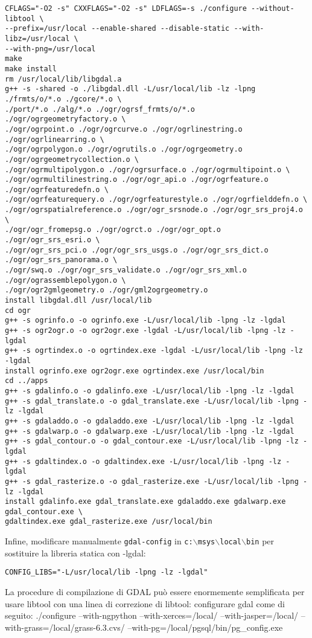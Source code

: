 \begin{verbatim}
CFLAGS="-O2 -s" CXXFLAGS="-O2 -s" LDFLAGS=-s ./configure --without-libtool \
--prefix=/usr/local --enable-shared --disable-static --with-libz=/usr/local \
--with-png=/usr/local
make
make install
rm /usr/local/lib/libgdal.a
g++ -s -shared -o ./libgdal.dll -L/usr/local/lib -lz -lpng ./frmts/o/*.o ./gcore/*.o \
./port/*.o ./alg/*.o ./ogr/ogrsf_frmts/o/*.o ./ogr/ogrgeometryfactory.o \
./ogr/ogrpoint.o ./ogr/ogrcurve.o ./ogr/ogrlinestring.o ./ogr/ogrlinearring.o \
./ogr/ogrpolygon.o ./ogr/ogrutils.o ./ogr/ogrgeometry.o ./ogr/ogrgeometrycollection.o \
./ogr/ogrmultipolygon.o ./ogr/ogrsurface.o ./ogr/ogrmultipoint.o \
./ogr/ogrmultilinestring.o ./ogr/ogr_api.o ./ogr/ogrfeature.o ./ogr/ogrfeaturedefn.o \ 
./ogr/ogrfeaturequery.o ./ogr/ogrfeaturestyle.o ./ogr/ogrfielddefn.o \
./ogr/ogrspatialreference.o ./ogr/ogr_srsnode.o ./ogr/ogr_srs_proj4.o \
./ogr/ogr_fromepsg.o ./ogr/ogrct.o ./ogr/ogr_opt.o ./ogr/ogr_srs_esri.o \
./ogr/ogr_srs_pci.o ./ogr/ogr_srs_usgs.o ./ogr/ogr_srs_dict.o ./ogr/ogr_srs_panorama.o \
./ogr/swq.o ./ogr/ogr_srs_validate.o ./ogr/ogr_srs_xml.o ./ogr/ograssemblepolygon.o \
./ogr/ogr2gmlgeometry.o ./ogr/gml2ogrgeometry.o
install libgdal.dll /usr/local/lib
cd ogr
g++ -s ogrinfo.o -o ogrinfo.exe -L/usr/local/lib -lpng -lz -lgdal
g++ -s ogr2ogr.o -o ogr2ogr.exe -lgdal -L/usr/local/lib -lpng -lz -lgdal
g++ -s ogrtindex.o -o ogrtindex.exe -lgdal -L/usr/local/lib -lpng -lz -lgdal
install ogrinfo.exe ogr2ogr.exe ogrtindex.exe /usr/local/bin
cd ../apps
g++ -s gdalinfo.o -o gdalinfo.exe -L/usr/local/lib -lpng -lz -lgdal
g++ -s gdal_translate.o -o gdal_translate.exe -L/usr/local/lib -lpng -lz -lgdal
g++ -s gdaladdo.o -o gdaladdo.exe -L/usr/local/lib -lpng -lz -lgdal
g++ -s gdalwarp.o -o gdalwarp.exe -L/usr/local/lib -lpng -lz -lgdal
g++ -s gdal_contour.o -o gdal_contour.exe -L/usr/local/lib -lpng -lz -lgdal
g++ -s gdaltindex.o -o gdaltindex.exe -L/usr/local/lib -lpng -lz -lgdal
g++ -s gdal_rasterize.o -o gdal_rasterize.exe -L/usr/local/lib -lpng -lz -lgdal
install gdalinfo.exe gdal_translate.exe gdaladdo.exe gdalwarp.exe gdal_contour.exe \
gdaltindex.exe gdal_rasterize.exe /usr/local/bin

\end{verbatim}

Infine, modificare manualmente \texttt{gdal-config} in \texttt{c:$\backslash$msys$\backslash$local$\backslash$bin} per sostituire la libreria statica con -lgdal:

\begin{verbatim}
CONFIG_LIBS="-L/usr/local/lib -lpng -lz -lgdal"
\end{verbatim}
La procedure di compilazione di GDAL può essere enormemente semplificata per usare libtool con una linea di correzione di libtool:
configurare gdal come di seguito:
./configure --with-ngpython --with-xerces=/local/ --with-jasper=/local/ --with-grass=/local/grass-6.3.cvs/ --with-pg=/local/pgsql/bin/pg\_config.exe 

